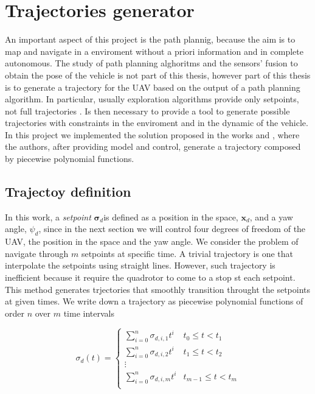 \chapter{Trajectories generator}
\label{trajectoriesGenerator}

An important aspect of this project is the path plannig, because the aim is to map and navigate in a enviroment without a priori information and in complete autonomous. The study of path planning alghoritms and the sensors' fusion to obtain the pose of the vehicle is not part of this thesis, however part of this thesis is to generate a trajectory for the UAV based on the output of a path planning algorithm. In particular, usually exploration algorithms provide only setpoints, not full trajectories \cite{potentialField} \cite{visionBasedMAV}. Is then necessary to provide a tool to generate possible trajectories with constraints in the enviroment and in the dynamic of the vehicle. In this project we implemented the solution proposed in the works \cite{minimumSnap} and \cite{polyTraj}, where the authors, after providing model and control, generate a trajectory composed by piecewise polynomial functions.


\section{Trajectoy definition}
\label{trajDefinition}

In this work, a \textit{setpoint} $\boldsymbol{\sigma}_d$is defined as a position in the space, $\mathbf{x}_d$, and a yaw angle, $\psi_d$, since in the next section we will control four degrees of freedom of the UAV, the position in the space and the yaw angle. We consider the problem of navigate through $m$ setpoints at specific time. A trivial trajectory is one that interpolate the setpoints using straight lines. However, such trajectory is inefficient because it require the quadrotor to come to a stop st each setpoint. This method generates trjectories that smoothly transition throught the setpoints at given times. We write down a trajectory as piecewise polynomial functions of order $n$ over $m$ time intervals

\begin{equation}
	\sigma_d(t)=
	\begin{cases}
		\sum\limits_{i=0}^{n}\sigma_{d,i,1}t^i & t_0 \le t < t_1 \\
		\sum\limits_{i=0}^{n}\sigma_{d,i,2}t^i & t_1 \le t < t_2 \\
		\vdots \\
		\sum\limits_{i=0}^{n}\sigma_{d,i,m}t^i & t_{m-1} \le t < t_m \\
	\end{cases}
	\label{eq:defTraj}
\end{equation}

